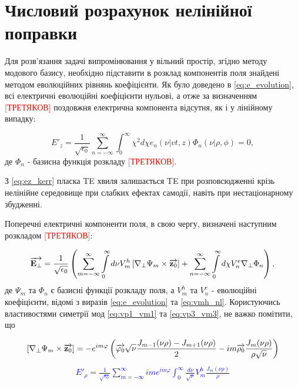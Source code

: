 \section{Числовий розрахунок нелінійної поправки}

Для розв'язання задачі випромінювання у вільний простір, згідно методу 
модового базису, необхідно підставити в розклад компонентів поля знайдені 
методом еволюційних рівнянь коефіцієнти. Як було доведено в 
\eqref{eq:e_evolution}, всі електричні еволюційні коефіцієнти нульові,
а отже за визначенням \textcolor{red}{[ТРЕТЯКОВ]} поздовжня електрична
компонента відсутня, як і у лінійному випадку:

\begin{equation} \label{eq:ez_kerr}
E'_z = \frac{1}{\sqrt{\epsilon_0}} \sum_{n=-\infty}^{\infty}
\int_0^\infty \chi^2 d \chi e_n (\nu | vt, z) \Phi_n (\nu | \rho, \phi) = 0,
\end{equation}
%
де $ \Phi_n $ - базисна функція розкладу \textcolor{red}{[ТРЕТЯКОВ]}.

З \eqref{eq:ez_kerr} пласка TE хвиля залишається TE при розповсюдженні 
крізь нелінійне середовище при слабких ефектах самодії, навіть при 
нестаціонарному збудженні.

Поперечні електричні компоненти поля, в свою чергу, визначені наступним 
розкладом \textcolor{red}{[ТРЕТЯКОВ]}:

\begin{equation} \begin{aligned}
\overrightarrow{\mathbf E_\perp} = \frac{1}{\sqrt{\epsilon_0}} \left( 
\sum \limits_{m=-\infty}^{\infty} \int \limits_{0}^{\infty} 
d \nu V_m^h \left[  \nabla_\perp \Psi_m  \times  \overrightarrow{\mathbf z_0}  \right] +
\sum \limits_{n=-\infty}^{\infty} \int \limits_{0}^{\infty}
d \chi V_n^e \nabla_\perp \Phi_n \right),
\end{aligned} \end{equation}
%
де $ \Psi_m $ та $ \Phi_n  $ є базисні функції розкладу поля, а $ V_m^h $
та $ V_n^e $ - еволюційні коефіцієнти, відомі з виразів \eqref{eq:e_evolution}
та \eqref{eq:vmh_nl}. Користуючись властивостями симетрії мод 
\eqref{eq:vp1_vm1} та \eqref{eq:vp3_vm3}, не важко помітити, що

%
\textcolor{blue} { \begin{equation*} \begin{aligned}
\left[  \nabla_\perp \Psi_m  \times  \overrightarrow{\mathbf z_0}  \right] = 
- e^{im\varphi} \left( \overrightarrow{\mathbf \varphi_0} \sqrt{\nu} 
\frac{J_{m-1} (\nu \rho) - J_{m+1} (\nu \rho)}{2} - 
i m \overrightarrow{\mathbf \rho_0} \frac{J_m (\nu \rho)}{ \rho \sqrt{\nu}} \right)
\end{aligned} \end{equation*} }
%
\textcolor{blue} { \begin{equation*} \begin{aligned}
E'_\rho = \frac{1}{\sqrt{\epsilon_0}} \sum_{m=-\infty}^{\infty} 
i m e^{im\varphi} \int_{0}^{\infty} \frac{d \nu}{\sqrt{\nu}} 
V_m^h \frac{J_m(\nu \rho)}{\rho}
\end{aligned} \end{equation*} }

